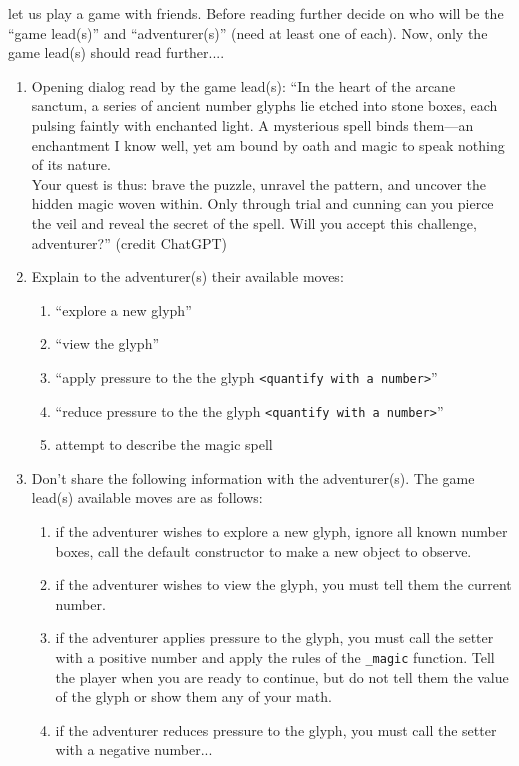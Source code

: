 \documentclass[addpoints,12pt]{exam}
\begin{document}
\begin{questions}
 let us play a game with friends. Before reading further decide on who will be the ``game lead(s)'' and ``adventurer(s)'' (need at least one of each). Now, only the game lead(s) should read further....
\begin{enumerate}
    \item Opening dialog read by the game lead(s): ``In the heart of the arcane sanctum, a series of ancient number glyphs lie etched into stone boxes, each pulsing faintly with enchanted light. A mysterious spell binds them—an enchantment I know well, yet am bound by oath and magic to speak nothing of its nature. \\
Your quest is thus: brave the puzzle, unravel the pattern, and uncover the hidden magic woven within. Only through trial and cunning can you pierce the veil and reveal the secret of the spell. Will you accept this challenge, adventurer?'' (credit ChatGPT)
    \item Explain to the adventurer(s) their available moves: 
    \begin{enumerate}
        \item ``explore a new glyph''
        \item ``view the glyph''
        \item ``apply pressure to the the glyph \texttt{<quantify with a number>}''
        \item ``reduce pressure to the the glyph \texttt{<quantify with a number>}''
        \item attempt to describe the magic spell
    \end{enumerate}
    \item Don't share the following information with the adventurer(s). The game lead(s) available moves are as follows:
    \begin{enumerate}
        \item if the adventurer wishes to explore a new glyph, ignore all known number boxes, call the default constructor to make a new object to observe.
        \item if the adventurer wishes to view the glyph, you must tell them the current number.
        \item if the adventurer applies pressure to the glyph, you must call the setter with a positive number and apply the rules of the \texttt{\_magic} function. Tell the player when you are ready to continue, but do not tell them the value of the glyph or show them any of your math.
        \item if the adventurer reduces pressure to the glyph, you must call the setter with a negative number...

\end{enumerate}
\end{enumerate}
\end{questions}
\end{document}

